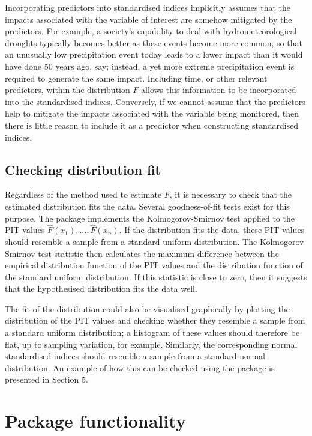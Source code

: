 Incorporating predictors into standardised indices implicitly assumes that the impacts associated with the variable of interest are somehow mitigated by the predictors. For example, a society's capability to deal with hydrometeorological droughts typically becomes better as these events become more common, so that an unusually low precipitation event today leads to a lower impact than it would have done 50 years ago, say; instead, a yet more extreme precipitation event is required to generate the same impact. Including time, or other relevant predictors, within the distribution \(F\) allows this information to be incorporated into the standardised indices. Conversely, if we cannot assume that the predictors help to mitigate the impacts associated with the variable being monitored, then there is little reason to include it as a predictor when constructing standardised indices.

\subsection{Checking distribution fit}\label{checking-distribution-fit}

Regardless of the method used to estimate \(F\), it is necessary to check that the estimated distribution fits the data. Several goodness-of-fit tests exist for this purpose. The  package implements the Kolmogorov-Smirnov test \citep{Massey1951} applied to the PIT values \(\hat{F}(x_{1}), \dots, \hat{F}(x_{n})\). If the distribution fits the data, these PIT values should resemble a sample from a standard uniform distribution. The Kolmogorov-Smirnov test statistic then calculates the maximum difference between the empirical distribution function of the PIT values and the distribution function of the standard uniform distribution. If this statistic is close to zero, then it suggests that the hypothesised distribution fits the data well.

The fit of the distribution could also be visualised graphically by plotting the distribution of the PIT values and checking whether they resemble a sample from a standard uniform distribution; a histogram of these values should therefore be flat, up to sampling variation, for example. Similarly, the corresponding normal standardised indices should resemble a sample from a standard normal distribution. An example of how this can be checked using the  package is presented in Section 5.

\section{Package functionality}\label{package-functionality}

